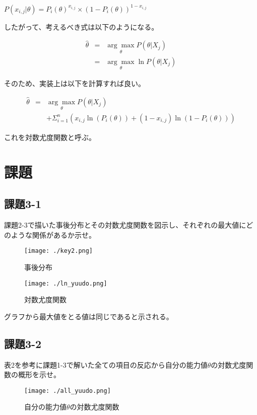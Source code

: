 \documentclass{jsarticle}
\begin{document}
$P(x_{i,j}| \theta) = {P_i(\theta)}^{x_{i,j}} \times {(1 - P_i(\theta))}^{1 - x_{i,j}}$

したがって、考えるべき式は以下のようになる。

\begin{eqnarray*}
  \hat{\theta} &=& \underset{\theta}{\arg \max} P(\theta | X_j) \\
               &=& \underset{\theta}{\arg \max} \ln P(\theta | X_j)
\end{eqnarray*}

そのため、実装上は以下を計算すれば良い。

\begin{eqnarray*}
  \hat{\theta} &=& \underset{\theta}{\arg \max} P(\theta | X_j) \\
                && + {\Sigma}^n_{i=1}(x_{i,j} \ln (P_i(\theta)) + (1 - x_{i,j}) \ln (1 - P_i(\theta)))
\end{eqnarray*}

これを対数尤度関数と呼ぶ。

\section{課題}
\subsection{課題3-1}
課題2-3で描いた事後分布とその対数尤度関数を図示し、それぞれの最大値にどのような関係があるか示せ。

\begin{figure}[H]
  \centering
  \texttt{[image: ./key2.png]}
  \caption{事後分布}
\end{figure}

\begin{figure}[H]
  \centering
  \texttt{[image: ./ln\_yuudo.png]}
  \caption{対数尤度関数}
\end{figure}

グラフから最大値をとる値は同じであると示される。

\subsection{課題3-2}
表2を参考に課題1-3で解いた全ての項目の反応から自分の能力値$\theta$の対数尤度関数の概形を示せ。

\begin{figure}[H]
  \centering
  \texttt{[image: ./all\_yuudo.png]}
  \caption{自分の能力値$\theta$の対数尤度関数}
\end{figure}
\end{document}
